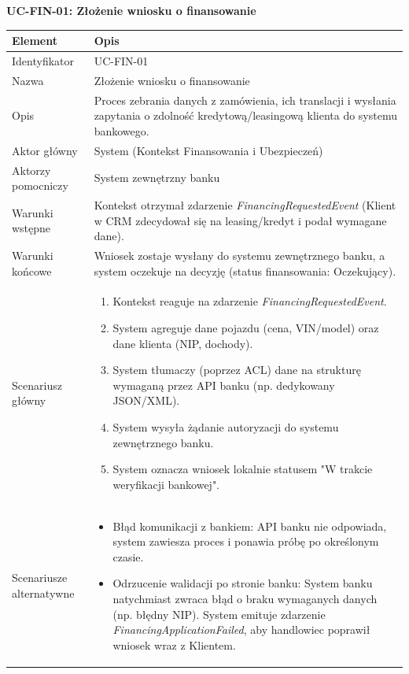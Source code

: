 \textbf{UC-FIN-01: Złożenie wniosku o finansowanie}

\begin{longtable}{|p{4cm}|p{11cm}|}
\hline
\textbf{Element} & \textbf{Opis} \\
\hline

Identyfikator & UC-FIN-01 \\
\hline

Nazwa & Złożenie wniosku o finansowanie \\
\hline

Opis & 
Proces zebrania danych z zamówienia, ich translacji i wysłania zapytania o zdolność kredytową/leasingową klienta do systemu bankowego. \\
\hline

Aktor główny & System (Kontekst Finansowania i Ubezpieczeń) \\
\hline

Aktorzy pomocniczy & System zewnętrzny banku \\
\hline

Warunki wstępne & 
Kontekst otrzymał zdarzenie \textit{FinancingRequestedEvent} (Klient w CRM zdecydował się na leasing/kredyt i podał wymagane dane). \\
\hline

Warunki końcowe & 
Wniosek zostaje wysłany do systemu zewnętrznego banku, a system oczekuje na decyzję (status finansowania: Oczekujący). \\
\hline

Scenariusz główny & 
\begin{enumerate}
    \item Kontekst reaguje na zdarzenie \textit{FinancingRequestedEvent}.
    \item System agreguje dane pojazdu (cena, VIN/model) oraz dane klienta (NIP, dochody).
    \item System tłumaczy (poprzez ACL) dane na strukturę wymaganą przez API banku (np. dedykowany JSON/XML).
    \item System wysyła żądanie autoryzacji do systemu zewnętrznego banku.
    \item System oznacza wniosek lokalnie statusem "W trakcie weryfikacji bankowej".
\end{enumerate} \\
\hline

Scenariusze alternatywne & 
\begin{itemize}
    \item [A1] Błąd komunikacji z bankiem: API banku nie odpowiada, system zawiesza proces i ponawia próbę po określonym czasie.
    \item [A2] Odrzucenie walidacji po stronie banku: System banku natychmiast zwraca błąd o braku wymaganych danych (np. błędny NIP). System emituje zdarzenie \textit{FinancingApplicationFailed}, aby handlowiec poprawił wniosek wraz z Klientem.
\end{itemize} \\
\hline
\end{longtable}

